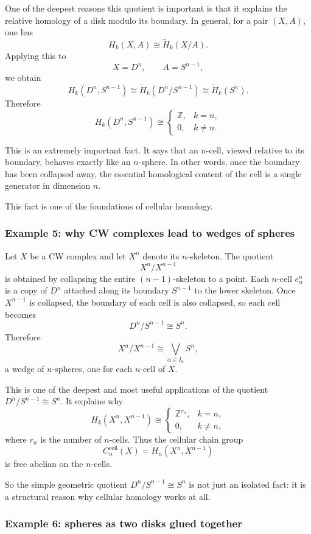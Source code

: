 \documentclass[12pt,a4paper]{article}
\theoremstyle{notespace}
\begin{document}
One of the deepest reasons this quotient is important is that it explains the relative homology of a disk modulo its boundary. In general, for a pair \((X,A)\), one has
\[
H_k(X,A)\cong \widetilde H_k(X/A).
\]
Applying this to
\[
X=D^n,
\qquad
A=S^{n-1},
\]
we obtain
\[
H_k(D^n,S^{n-1})
\cong
\widetilde H_k(D^n/S^{n-1})
\cong
\widetilde H_k(S^n).
\]
Therefore
\[
H_k(D^n,S^{n-1})\cong
\begin{cases}
	\mathbb Z, & k=n,\\
	0, & k\neq n.
\end{cases}
\]

This is an extremely important fact. It says that an \(n\)-cell, viewed relative to its boundary, behaves exactly like an \(n\)-sphere. In other words, once the boundary has been collapsed away, the essential homological content of the cell is a single generator in dimension \(n\).

This fact is one of the foundations of cellular homology.

\subsubsection*{Example 5: why CW complexes lead to wedges of spheres}

Let \(X\) be a CW complex and let \(X^n\) denote its \(n\)-skeleton. The quotient
\[
X^n/X^{n-1}
\]
is obtained by collapsing the entire \((n-1)\)-skeleton to a point. Each \(n\)-cell \(e_\alpha^n\) is a copy of \(D^n\) attached along its boundary \(S^{n-1}\) to the lower skeleton. Once \(X^{n-1}\) is collapsed, the boundary of each cell is also collapsed, so each cell becomes
\[
D^n/S^{n-1}\cong S^n.
\]
Therefore
\[
X^n/X^{n-1}\cong \bigvee_{\alpha\in I_n} S^n,
\]
a wedge of \(n\)-spheres, one for each \(n\)-cell of \(X\).

This is one of the deepest and most useful applications of the quotient \(D^n/S^{n-1}\cong S^n\). It explains why
\[
H_k(X^n,X^{n-1})\cong
\begin{cases}
	\mathbb Z^{r_n}, & k=n,\\
	0, & k\neq n,
\end{cases}
\]
where \(r_n\) is the number of \(n\)-cells. Thus the cellular chain group
\[
C_n^{\mathrm{cell}}(X)=H_n(X^n,X^{n-1})
\]
is free abelian on the \(n\)-cells.

So the simple geometric quotient \(D^n/S^{n-1}\cong S^n\) is not just an isolated fact: it is a structural reason why cellular homology works at all.

\subsubsection*{Example 6: spheres as two disks glued together}
\end{document}
